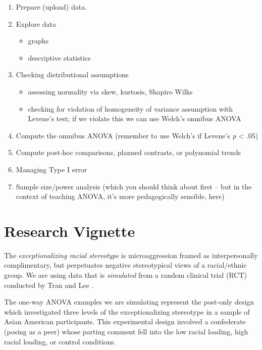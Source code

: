 \documentclass[
  11pt,
]{book}
\providecommand{\tightlist}{%
  \setlength{\itemsep}{0pt}\setlength{\parskip}{0pt}}
\begin{document}
\begin{enumerate}
\def\labelenumi{\arabic{enumi}.}
\tightlist
\item
  Prepare (upload) data.
\item
  Explore data

  \begin{itemize}
  \tightlist
  \item
    graphs
  \item
    descriptive statistics
  \end{itemize}
\item
  Checking distributional assumptions

  \begin{itemize}
  \tightlist
  \item
    assessing normality via skew, kurtosis, Shapiro Wilks
  \item
    checking for violation of homogeneity of variance assumption with Levene's test; if we violate this we can use Welch's omnibus ANOVA
  \end{itemize}
\item
  Compute the omnibus ANOVA (remember to use Welch's if Levene's \emph{p} \textless{} .05)
\item
  Compute post-hoc comparisons, planned contrasts, or polynomial trends
\item
  Managing Type I error
\item
  Sample size/power analysis (which you should think about first -- but in the context of teaching ANOVA, it's more pedagogically sensible, here)
\end{enumerate}

\hypertarget{research-vignette-4}{%
\section{Research Vignette}\label{research-vignette-4}}

The \emph{exceptionalizing racial stereotype} is microaggression framed as interpersonally complimentary, but perpetuates negative stereotypical views of a racial/ethnic group. We are using data that is \emph{simulated} from a random clinical trial (RCT) conducted by Tran and Lee \citeyearpar{tran_you_2014}.

The one-way ANOVA examples we are simulating represent the post-only design which investigated three levels of the exceptionalizing stereotype in a sample of Asian American participants. This experimental design involved a confederate (posing as a peer) whose parting comment fell into the low racial loading, high racial loading, or control conditions.
\end{document}
